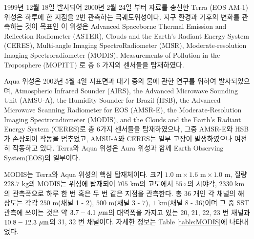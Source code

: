 1999년 12월 18일 발사되어 2000년 2월 24일 부터 자료를 송신한 Terra (EOS AM-1) 위성은 하루에 한 지점을 2번 관측하는 극궤도위성이다. 지구 환경과 기후의 변화를 관측하는 것이 목표인 이 위성은 Advanced Spaceborne Thermal Emission and Reflection Radiometer (ASTER), Clouds and the Earth's Radiant Energy System (CERES), Multi-angle Imaging SpectroRadiometer (MISR), Moderate-resolution Imaging Spectroradiometer (MODIS),  Measurements of Pollution in the Troposphere (MOPITT) 로 총 6 가지의 센서들을 탑재하였다. 

Aqua 위성은 2002년 5월 4일 지표면과 대기 중의 물에 관한 연구를 위하여 발사되었으며, Atmospheric Infrared Sounder (AIRS), the Advanced Microwave Sounding Unit (AMSU-A), the Humidity Sounder for Brazil (HSB), the Advanced Microwave Scanning Radiometer for EOS (AMSR-E), the Moderate-Resolution Imaging Spectroradiometer (MODIS), and the Clouds and the Earth's Radiant Energy System (CERES)로 총 6가지 센서들을 탑재하였으나, 그중 AMSR-E와 HSB가 손상되어 작동을 멈추었고, AMSU-A와 CERES는 일부 고장이 발생하였으나 여전히 작동하고 있다. Terra와 Aqua 위성은 Aura 위성과 함께 Earth Observing System(EOS)의 일부이다. 

MODIS는 Terra와 Aqua 위성의 핵심 탑재체이다. 크기 $1.0\textrm{ m} \times 1.6 \textrm{ m} \times 1.0 \textrm{ m}$, 질량 $228.7 \textrm{ kg}$의 MODIS는 위성에 탑재되어 $705 \textrm{ km}$의 고도에서 $55 \circ$의 시야각, $2330 \textrm{ km}$의 관측폭으로 하루 한 번 혹은 두 번 같은 지점을 관측한다. 총 36 개인 각 채널의 해상도는 각각 $250 \textrm{ m}$(채널 1 - 2), $500 \textrm{ m}$(채널 3 - 7), $1 \textrm{ km}$(채널 8 - 36)이며 그 중 SST 관측에 쓰이는 것은 약 $3.7 - 4.1 \textrm{ }\rm{\mu m}$의 대역폭을 가지고 있는 20, 21, 22, 23 번 채널과 $10.8 - 12.3 \textrm{ }\rm{\mu m}$의 31, 32 번 채널이다. 자세한 정보는 Table \ref{table:MODIS}에 나타내었다.


